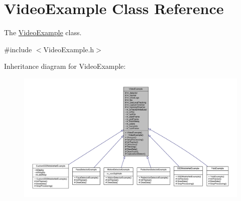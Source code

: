 \hypertarget{class_video_example}{}\section{Video\+Example Class Reference}
\label{class_video_example}


The \mbox{\hyperlink{class_video_example}{Video\+Example}} class.  




{\ttfamily \#include $<$Video\+Example.\+h$>$}



Inheritance diagram for Video\+Example\+:\nopagebreak
\begin{figure}[H]
\begin{center}
\leavevmode
\includegraphics[width=350pt]{class_video_example__inherit__graph}
\end{center}
\end{figure}


